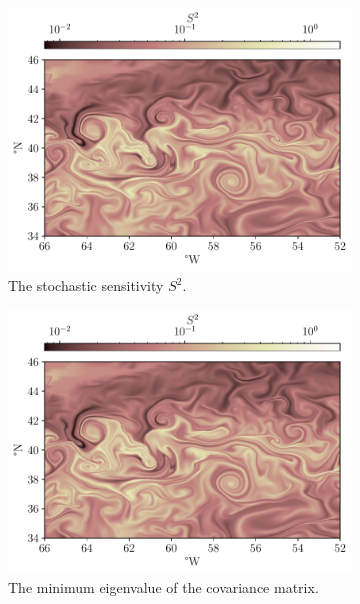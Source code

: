\begin{figure}
	\begin{center}
		\begin{subfigure}[t]{\textwidth}
			\includegraphics[width=\textwidth]{chp06_applications/figures/gulf_stream/S2_field_high}
			\caption{The stochastic sensitivity \(S^2\).}
		\end{subfigure}
		\begin{subfigure}[t]{0.49\textwidth}
			\includegraphics[width=\textwidth]{chp06_applications/figures/gulf_stream/s2_field_high}
			\caption{The minimum eigenvalue of the covariance matrix.}
		\end{subfigure}
		\begin{subfigure}[t]{0.49\textwidth}

\end{subfigure}
\end{center}
\end{figure}
